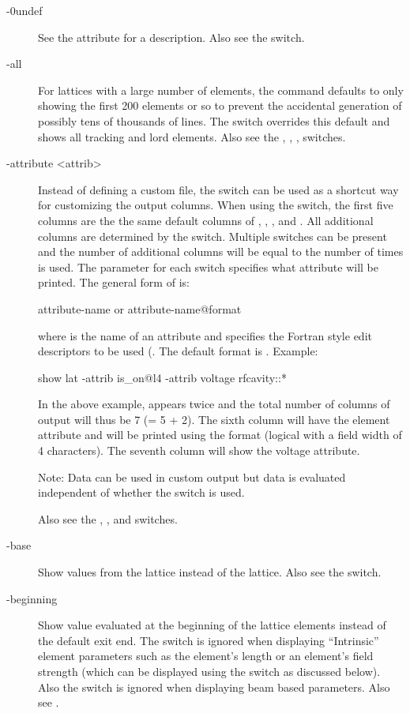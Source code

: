 {{{{{{{{\begin{description}
\item[-0undef] \Newline
See the  attribute for a description. Also see the  switch.
%
\item[-all] \Newline
For lattices with a large number of elements, the  command defaults to only showing
the first 200 elements or so to prevent the accidental generation of possibly tens of thousands of
lines. The  switch overrides this default and shows all tracking and lord elements. Also
see the , , ,  switches.
%
\item[-attribute <attrib>] \Newline
Instead of defining a custom file, the  switch can be used as a shortcut way
for customizing the output columns.  When using the  switch, the first five columns
are the the same default columns of , , ,  and
. All additional columns are determined by the  switch. Multiple
 switches can be present and the number of additional columns will be equal to the
number of times  is used.  The  parameter for each 
switch specifies what attribute will be printed.  The general form of  is:
\begin{example}
  attribute-name         or
  attribute-name@format
\end{example}
where  is the name of an attribute and  specifies the Fortran style
edit descriptors to be used (. The default format is .  Example:
\begin{example}
  show lat -attrib is_on@l4 -attrib voltage rfcavity::*
\end{example}
In the above example,  appears twice and the total number of columns of output will
thus be 7 (= 5 + 2). The sixth column will have the  element attribute and will be printed
using the  format (logical with a field width of 4 characters). The seventh column will show
the voltage attribute.

Note: Data can be used in custom output but data is evaluated independent of whether the
 switch is used.

Also see the , , and  switches.
%
\item[-base] \Newline
  Show values from the  lattice instead of the  lattice. Also see the  switch.
%
\item[-beginning] \Newline
Show value evaluated at the beginning of the lattice elements instead of the default exit end.
The  switch is ignored when displaying ``Intrinsic'' element
parameters such as the element's length or an element's field strength (which can be displayed using
the  switch as discussed below). Also the  switch is ignored when
displaying beam based parameters. Also see .


\end{description}}}}}}}}}
